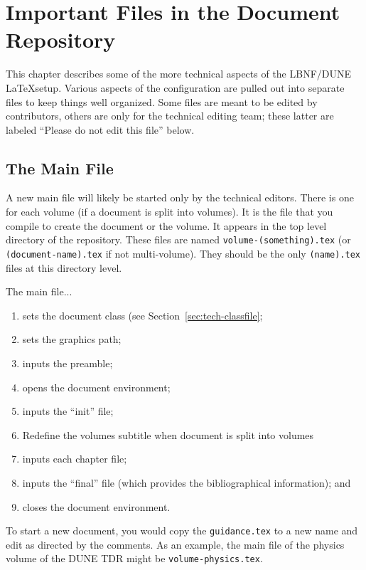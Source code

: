\chapter{Important Files in the Document Repository}
\label{ch:tech}

This chapter describes some of the more technical aspects of the LBNF/DUNE \LaTeX setup. Various aspects of the configuration are pulled out into separate files to keep things well organized.  Some files are meant to be edited by contributors, others are only for the technical editing team; these latter are labeled ``Please do not edit this file'' below.

\section{The Main File}
\label{sec:tech-mainfile}

A new main file will likely be started only by the technical editors. There is one for each volume (if a document is split into volumes). It is the file that you compile to create the document or the volume. It appears in the top level directory of the repository.  These files are named \texttt{volume-(something).tex} (or \texttt{(document-name).tex} if not multi-volume). They should be the only \texttt{(name).tex} files at this directory level.

The main file...

\begin{enumerate}
\item sets the document class (see Section~\ref{sec:tech-classfile};
\item sets the graphics path;
\item inputs the preamble;
\item opens the document environment;
\item inputs the ``init'' file;
\item Redefine the volumes subtitle when document is split into volumes
\item inputs each chapter file;
\item inputs the ``final'' file (which provides the bibliographical information); and
\item closes the document environment.
\end{enumerate}

To start a new document, you would copy the \texttt{guidance.tex} to a new
name and edit as directed by the comments.  As an example, the main file of the physics volume of the DUNE TDR might be \texttt{volume-physics.tex}. 

